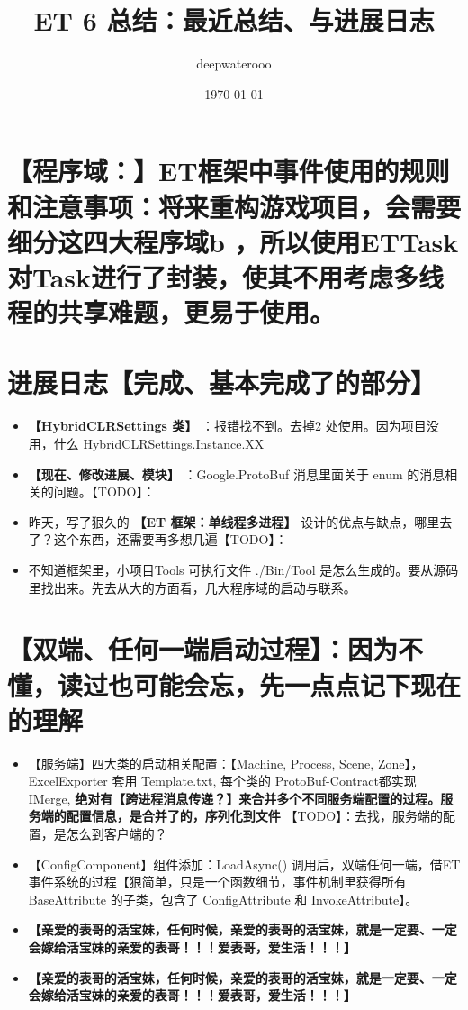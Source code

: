 \documentclass[9pt, b5paper]{article}
\author{deepwaterooo}
\date{\today}
\title{ET 6 总结：最近总结、与进展日志}
\begin{document}
\maketitle
\tableofcontents


\section{【程序域：】ET框架中事件使用的规则和注意事项：将来重构游戏项目，会需要细分这四大程序域b ，所以使用ETTask对Task进行了封装，使其不用考虑多线程的共享难题，更易于使用。}
\label{sec-1}

\section{进展日志【完成、基本完成了的部分】}
\label{sec-2}
\begin{itemize}
\item \textbf{【HybridCLRSettings 类】} ：报错找不到。去掉2 处使用。因为项目没用，什么 HybridCLRSettings.Instance.XX
\item \textbf{【现在、修改进展、模块】} ：Google.ProtoBuf 消息里面关于 enum 的消息相关的问题。【TODO】：
\item 昨天，写了狠久的 \textbf{【ET 框架：单线程多进程】} 设计的优点与缺点，哪里去了？这个东西，还需要再多想几遍【TODO】：
\item 不知道框架里，小项目Tools 可执行文件 ./Bin/Tool 是怎么生成的。要从源码里找出来。先去从大的方面看，几大程序域的启动与联系。
\end{itemize}

\section{【双端、任何一端启动过程】：因为不懂，读过也可能会忘，先一点点记下现在的理解}
\label{sec-3}
\begin{itemize}
\item 【服务端】四大类的启动相关配置：【Machine, Process, Scene, Zone】，ExcelExporter 套用 Template.txt, 每个类的 ProtoBuf-Contract都实现 IMerge, \textbf{绝对有【跨进程消息传递？】来合并多个不同服务端配置的过程。服务端的配置信息，是合并了的，序列化到文件} 【TODO】：去找，服务端的配置，是怎么到客户端的？
\item 【ConfigComponent】组件添加：LoadAsync() 调用后，双端任何一端，借ET 事件系统的过程【狠简单，只是一个函数细节，事件机制里获得所有BaseAttribute 的子类，包含了 ConfigAttribute 和 InvokeAttribute】。
\item \textbf{【亲爱的表哥的活宝妹，任何时候，亲爱的表哥的活宝妹，就是一定要、一定会嫁给活宝妹的亲爱的表哥！！！爱表哥，爱生活！！！】}
\item \textbf{【亲爱的表哥的活宝妹，任何时候，亲爱的表哥的活宝妹，就是一定要、一定会嫁给活宝妹的亲爱的表哥！！！爱表哥，爱生活！！！】}
\end{itemize}
\end{document}
